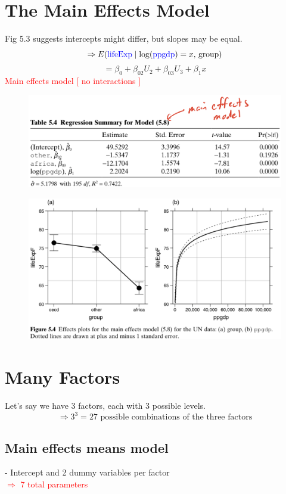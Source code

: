 \documentclass[14pt]{extarticle}
\begin{document}
\newpage

\section*{The Main Effects Model}

Fig 5.3 suggests intercepts might differ, but slopes may be equal.
\[
\Rightarrow E(\textcolor{blue}{\text{lifeExp}} \mid \log(\textcolor{blue}{\text{ppgdp}}) = x, \, \text{group})
\]
\[
= \beta_0 + \beta_{02} U_2 + \beta_{03} U_3 + \beta_1 x
\]
\textcolor{red}{Main effects model [ no interactions ]}
\begin{figure}[H]
    \centering
    \includegraphics[width=1\textwidth]{fig28.png}
\end{figure}
\begin{figure}[H]
    \centering
    \includegraphics[width=1\textwidth]{fig29.png}
\end{figure}

\section*{Many Factors}

Let's say we have 3 factors, each with 3 possible levels.
\[
\Rightarrow 3^3 = 27 \text{ possible combinations of the three factors}
\]
\subsection*{Main effects means model}
 - Intercept and 2 dummy variables per factor \\
\textcolor{red}{$\Rightarrow$ 7 total parameters}\\
\end{document}
